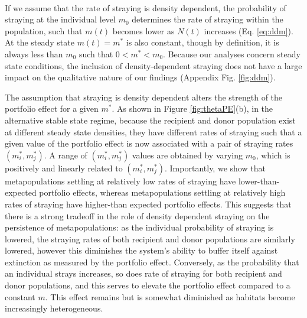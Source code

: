 \documentclass[twocolumn,preprintnumbers,amsmath,amssymb,superscriptaddress]{revtex4}
\begin{document}

\\
\noindent If we assume that the rate of straying is density dependent, the probability of straying at the individual level $m_0$ determines the rate of straying within the population, such that $m(t)$ becomes lower as $N(t)$ increases (Eq. \ref{eq:ddm}).
At the steady state $m(t)=m^*$ is also constant, though by definition, it is always less than $m_0$ such that $0 < m^* < m_0$.
Because our analyses concern steady state conditions, the inclusion of density-dependent straying does not have a large impact on the qualitative nature of our findings (Appendix Fig. \ref{fig:ddm}).

The assumption that straying is density dependent alters the strength of the portfolio effect for a given $m^*$.
As shown in Figure \ref{fig:thetaPE}(b), in the alternative stable state regime, because the recipient and donor population exist at different steady state densities, they have different rates of straying such that a given value of the portfolio effect is now associated with a pair of straying rates $(m_i^*,m_j^*)$.
A range of $(m_i^*,m_j^*)$ values are obtained by varying $m_0$, which is positively and linearly related to $(m_i^*,m_j^*)$.
Importantly, we show that metapopulations settling at relatively low rates of straying have lower-than-expected portfolio effects, whereas metapopulations settling at relatively high rates of straying have higher-than expected portfolio effects.
This suggests that there is a strong tradeoff in the role of density dependent straying on the persistence of metapopulations: as the individual probability of straying is lowered, the straying rates of both recipient and donor populations are similarly lowered, however this diminishes the system's ability to buffer itself against extinction as measured by the portfolio effect.
Conversely, as the probability that an individual strays increases, so does rate of straying for both recipient and donor populations, and this serves to elevate the portfolio effect compared to a constant $m$.
This effect remains but is somewhat diminished as habitats become increasingly heterogeneous.
\\
\end{document}
